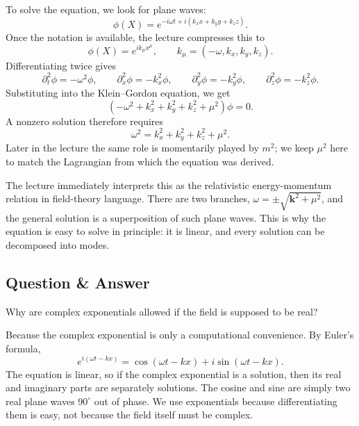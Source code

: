 To solve the equation, we look for plane waves:
\begin{equation}
\phi(X)=e^{-i\omega t+i(k_xx+k_yy+k_zz)}.
\end{equation}
Once the notation is available, the lecture compresses this to
\begin{equation}
\phi(X)=e^{ik_\mu x^\mu},
\qquad
k_\mu=(-\omega,k_x,k_y,k_z).
\end{equation}
Differentiating twice gives
\begin{equation}
\partial_t^2\phi=-\omega^2\phi,
\qquad
\partial_x^2\phi=-k_x^2\phi,
\qquad
\partial_y^2\phi=-k_y^2\phi,
\qquad
\partial_z^2\phi=-k_z^2\phi.
\end{equation}
Substituting into the Klein--Gordon equation, we get
\begin{equation}
\left(-\omega^2+k_x^2+k_y^2+k_z^2+\mu^2\right)\phi=0.
\end{equation}
A nonzero solution therefore requires
\begin{equation}
\omega^2=k_x^2+k_y^2+k_z^2+\mu^2.
\end{equation}
Later in the lecture the same role is momentarily played by \(m^2\); we keep \(\mu^2\) here to match the Lagrangian from which the equation was derived.

The lecture immediately interprets this as the relativistic energy-momentum relation in field-theory language. There are two branches, \(\omega=\pm\sqrt{\mathbf k^2+\mu^2}\), and the general solution is a superposition of such plane waves. This is why the equation is easy to solve in principle: it is linear, and every solution can be decomposed into modes.

\subsection{Question \& Answer}

Why are complex exponentials allowed if the field is supposed to be real?

Because the complex exponential is only a computational convenience. By Euler's formula,
\begin{equation}
e^{i(\omega t-kx)}
=
\cos(\omega t-kx)+i\sin(\omega t-kx).
\end{equation}
The equation is linear, so if the complex exponential is a solution, then its real and imaginary parts are separately solutions. The cosine and sine are simply two real plane waves \(90^\circ\) out of phase. We use exponentials because differentiating them is easy, not because the field itself must be complex.

